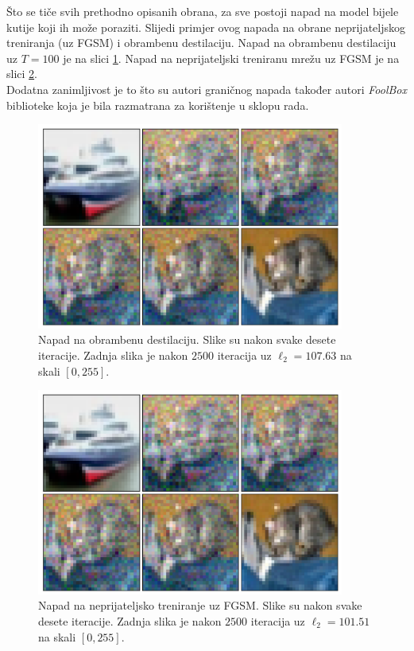 \documentclass[utf8, diplomski]{fer}
\begin{document}
Što se tiče svih prethodno opisanih obrana, za sve postoji napad na model bijele kutije koji ih može poraziti. Slijedi primjer ovog napada na obrane neprijateljskog treniranja (uz FGSM) i obrambenu destilaciju. Napad na obrambenu destilaciju uz $T = 100$ je na slici \ref{fig:boundary_distillation}. Napad na neprijateljski treniranu mrežu uz FGSM je na slici \ref{fig:boundary_fgsm_adv}. \\
Dodatna zanimljivost je to što su autori graničnog napada također autori \textit{FoolBox} biblioteke koja je bila razmatrana za korištenje u sklopu rada.

\begin{figure}[H]
\centering
\includegraphics[width=0.9\textwidth,keepaspectratio]{img/results/boundary_distillation.png}
\caption{Napad na obrambenu destilaciju. Slike su nakon svake desete iteracije. Zadnja slika je nakon $2500$ iteracija uz $\ell_{2} = 107.63$ na skali $[0, 255]$.}
\label{fig:boundary_distillation}
\end{figure}

\begin{figure}[H]
\centering
\includegraphics[width=0.9\textwidth,keepaspectratio]{img/results/boundary_distillation.png}
\caption{Napad na neprijateljsko treniranje uz FGSM. Slike su nakon svake desete iteracije. Zadnja slika je nakon $2500$ iteracija uz $\ell_{2} = 101.51$ na skali $[0, 255]$.}
\label{fig:boundary_fgsm_adv}
\end{figure}
\end{document}
